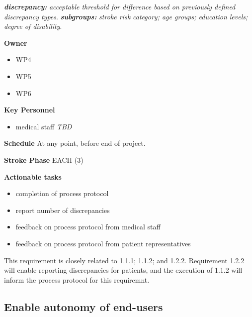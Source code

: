 \documentclass[
  letterpaper,
  DIV=11,
  numbers=noendperiod]{scrreport}
\providecommand{\tightlist}{%
  \setlength{\itemsep}{0pt}\setlength{\parskip}{0pt}}\usepackage{longtable,booktabs,array}
\begin{document}
\textbf{\emph{discrepancy:}} \emph{acceptable threshold for difference
based on previously defined discrepancy types}.
\textbf{\emph{subgroups:}} \emph{stroke risk category; age groups;
education levels; degree of disability}.

\textbf{Owner}

\begin{itemize}
\tightlist
\item
  WP4
\item
  WP5
\item
  WP6
\end{itemize}

\textbf{Key Personnel}

\begin{itemize}
\tightlist
\item
  medical staff \emph{TBD}
\end{itemize}

\textbf{Schedule} At any point, before end of project.

\textbf{Stroke Phase} EACH (3)

\textbf{Actionable tasks}

\begin{itemize}
\tightlist
\item
  completion of process protocol
\item
  report number of discrepancies
\item
  feedback on process protocol from medical staff
\item
  feedback on process protocol from patient representatives
\end{itemize}

\begin{tcolorbox}[enhanced jigsaw, arc=.35mm, breakable, coltitle=black, toptitle=1mm, colbacktitle=quarto-callout-note-color!10!white, toprule=.15mm, left=2mm, bottomrule=.15mm, opacitybacktitle=0.6, titlerule=0mm, colback=white, opacityback=0, title=\textcolor{quarto-callout-note-color}{\faInfo}\hspace{0.5em}{Note}, bottomtitle=1mm, colframe=quarto-callout-note-color-frame, leftrule=.75mm, rightrule=.15mm]

This requirement is closely related to 1.1.1; 1.1.2; and 1.2.2.
Requirement 1.2.2 will enable reporting discrepancies for patients, and
the execution of 1.1.2 will inform the process protocol for this
requiremnt.

\end{tcolorbox}

\hypertarget{enable-autonomy-of-end-users}{%
\subsection{Enable autonomy of
end-users}\label{enable-autonomy-of-end-users}}
\end{document}
